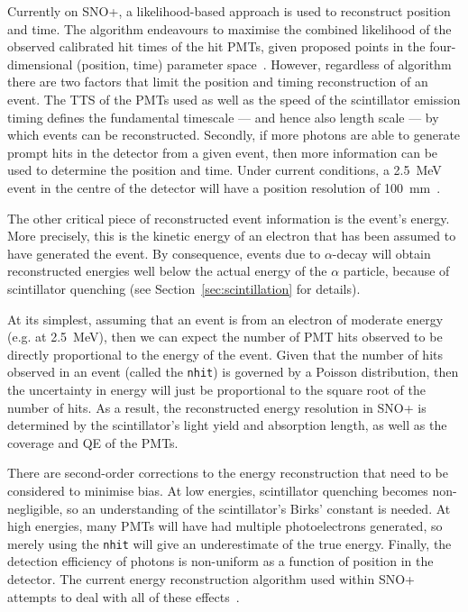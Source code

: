 Currently on SNO+, a likelihood-based approach is used to reconstruct position and time. The algorithm endeavours to maximise the combined likelihood of the observed calibrated hit times of the hit PMTs, given proposed points in the four-dimensional (position, time) parameter space~\cite{jonesBackgroundRejectionNeutrinoless2011,coulterModellingReconstructionEvents2013,parkerMultiPDFMethodPosition2021}. %
However, regardless of algorithm there are two factors that limit the position and timing reconstruction of an event. The TTS of the PMTs used as well as the speed of the scintillator emission timing defines the fundamental timescale --- and hence also length scale --- by which events can be reconstructed. Secondly, if more photons are able to generate prompt hits in the detector from a given event, then more information can be used to determine the position and time. Under current conditions, a \SI{2.5}{\MeV} event in the centre of the detector will have a position resolution of \SI{100}{\mm}~\cite{parkerRecoordinatingScintEffectiveSpeedMultiPDF2023}. %

The other critical piece of reconstructed event information is the event's energy. More precisely, this is the kinetic energy of an electron that has been assumed to have generated the event. By consequence, events due to $\alpha$-decay will obtain reconstructed energies well below the actual energy of the $\alpha$ particle, because of scintillator quenching (see Section~\ref{sec:scintillation} for details).

At its simplest, assuming that an event is from an electron of moderate energy (e.g. at \SI{2.5}{\MeV}), then we can expect the number of PMT hits observed to be directly proportional to the energy of the event. Given that the number of hits observed in an event (called the \texttt{nhit}) is governed by a Poisson distribution, then the uncertainty in energy will just be proportional to the square root of the number of hits. As a result, the reconstructed energy resolution in SNO+ is determined by the scintillator's light yield and absorption length, as well as the coverage and QE of the PMTs.

There are second-order corrections to the energy reconstruction that need to be considered to minimise bias. At low energies, scintillator quenching becomes non-negligible, so an understanding of the scintillator's Birks' constant is needed. At high energies, many PMTs will have had multiple photoelectrons generated, so merely using the \texttt{nhit} will give an underestimate of the true energy. Finally, the detection efficiency of photons is non-uniform as a function of position in the detector. The current energy reconstruction algorithm used within SNO+ attempts to deal with all of these effects~\cite{mottramUpdatedFunctionalForm2015,kroupovaImprovingSensitivityNeutrinoless2020}. %

